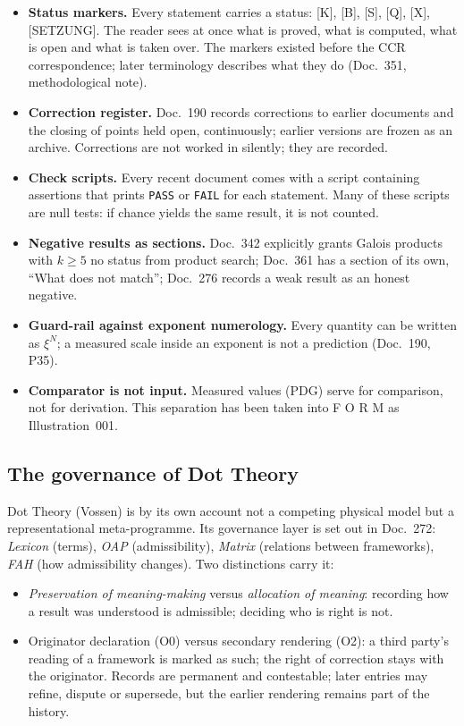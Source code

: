 \begin{itemize}
\item \textbf{Status markers.} Every statement carries a status: {[K]}, {[B]}, {[S]}, {[Q]},
  {[X]}, {[SETZUNG]}. The reader sees at once what is proved, what is computed, what is open
  and what is taken over. The markers existed before the CCR correspondence; later
  terminology describes what they do (Doc.~351, methodological note).
\item \textbf{Correction register.} Doc.~190 records corrections to earlier documents and the
  closing of points held open, continuously; earlier versions are frozen as an archive.
  Corrections are not worked in silently; they are recorded.
\item \textbf{Check scripts.} Every recent document comes with a script containing
  assertions that prints \texttt{PASS} or \texttt{FAIL} for each statement. Many of these
  scripts are null tests: if chance yields the same result, it is not counted.
\item \textbf{Negative results as sections.} Doc.~342 explicitly grants Galois products with
  $k\ge5$ no status from product search; Doc.~361 has a section of its own, ``What does not
  match''; Doc.~276 records a weak result as an honest negative.
\item \textbf{Guard-rail against exponent numerology.} Every quantity can be written as
  $\xi^N$; a measured scale inside an exponent is not a prediction (Doc.~190, P35).
\item \textbf{Comparator is not input.} Measured values (PDG) serve for comparison, not for
  derivation. This separation has been taken into F O R M as Illustration~001.
\end{itemize}

\subsection{The governance of Dot Theory}

Dot Theory (Vossen) is by its own account not a competing physical model but a
representational meta-programme. Its governance layer is set out in Doc.~272:
\emph{Lexicon} (terms), \emph{OAP} (admissibility), \emph{Matrix} (relations between
frameworks), \emph{FAH} (how admissibility changes). Two distinctions carry it:
\begin{itemize}
\item \emph{Preservation of meaning-making} versus \emph{allocation of meaning}: recording
  how a result was understood is admissible; deciding who is right is not.
\item Originator declaration (O0) versus secondary rendering (O2): a third party's reading
  of a framework is marked as such; the right of correction stays with the originator.
  Records are permanent and contestable; later entries may refine, dispute or supersede,
  but the earlier rendering remains part of the history.
\end{itemize}

